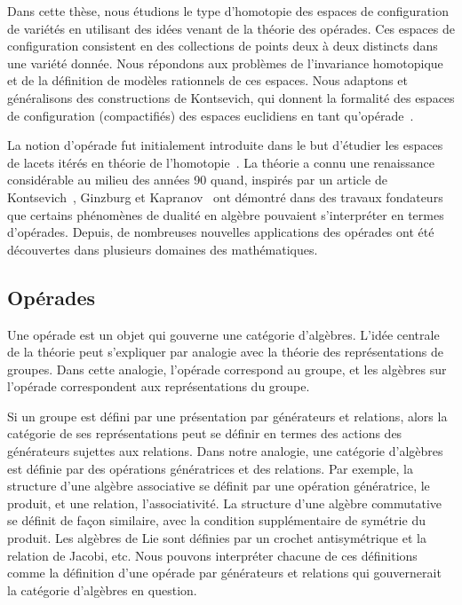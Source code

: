 

Dans cette thèse, nous étudions le type d'homotopie des espaces de configuration de variétés en utilisant des idées venant de la théorie des opérades.
Ces espaces de configuration consistent en des collections de points deux à deux distincts dans une variété donnée.
Nous répondons aux problèmes de l'invariance homotopique et de la définition de modèles rationnels de ces espaces.
Nous adaptons et généralisons des constructions de Kontsevich, qui donnent la formalité des espaces de configuration (compactifiés) des espaces euclidiens en tant qu'opérade~\cite{Kontsevich1999}.

La notion d'opérade fut initialement introduite dans le but d'étudier les espaces de lacets itérés en théorie de l'homotopie~\cite{May1972,BoardmanVogt1973}.
La théorie a connu une renaissance considérable au milieu des années 90 quand, inspirés par un article de Kontsevich~\cite{Kontsevich1993a}, Ginzburg et Kapranov~\cite{GinzburgKapranov1994} ont démontré dans des travaux fondateurs que certains phénomènes de dualité en algèbre pouvaient s'interpréter en termes d'opérades.
Depuis, de nombreuses nouvelles applications des opérades ont été découvertes dans plusieurs domaines des mathématiques.


\subsection*{Opérades}

Une opérade est un objet qui gouverne une catégorie d'algèbres.
L'idée centrale de la théorie peut s'expliquer par analogie avec la théorie des représentations de groupes.
Dans cette analogie, l'opérade correspond au groupe, et les algèbres sur l'opérade correspondent aux représentations du groupe.

Si un groupe est défini par une présentation par générateurs et relations, alors la catégorie de ses représentations peut se définir en termes des actions des générateurs sujettes aux relations.
Dans notre analogie, une catégorie d'algèbres est définie par des opérations génératrices et des relations.
Par exemple, la structure d'une algèbre associative se définit par une opération génératrice, le produit, et une relation, l'associativité.
La structure d'une algèbre commutative se définit de façon similaire, avec la condition supplémentaire de symétrie du produit.
Les algèbres de Lie sont définies par un crochet antisymétrique et la relation de Jacobi, etc.
Nous pouvons interpréter chacune de ces définitions comme la définition d'une opérade par générateurs et relations qui gouvernerait la catégorie d'algèbres en question.

